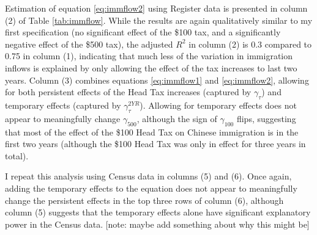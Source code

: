 Estimation of equation \ref{eq:immflow2} using Register data is presented in column (2) of Table \ref{tab:immflow}. While the results are again qualitatively similar to my first specification (no significant effect of the \$100 tax, and a significantly negative effect of the \$500 tax), the adjusted $R^2$ in column (2) is 0.3 compared to 0.75 in column (1), indicating that much less of the variation in immigration inflows is explained by only allowing the effect of the tax increases to last two years. Column (3) combines equations \ref{eq:immflow1} and \ref{eq:immflow2}, allowing for both persistent effects of the Head Tax increases (captured by $\gamma_{\tau}$) and temporary effects (captured by $\gamma_{\tau}^{2YR}$). 
Allowing for temporary effects does not appear to meaningfully change $\gamma_{500}$, although the sign of $\gamma_{100}$ flips, suggesting that most of the effect of the \$100 Head Tax on Chinese immigration is in the first two years (although the \$100 Head Tax was only in effect for three years in total).

I repeat this analysis using Census data in columns (5) and (6). Once again, adding the temporary effects to the equation does not appear to meaningfully change the persistent effects in the top three rows of column (6), although column (5) suggests that the temporary effects alone have significant explanatory power in the Census data. [note: maybe add something about why this might be]


